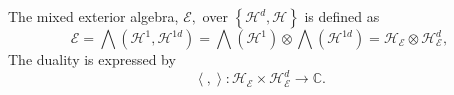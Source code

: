 \documentclass[aps,preprint]{revtex4}%
\begin{document}
The mixed exterior algebra, $\mathcal{E},$ over $\left\{  \mathcal{H}%
^{d},\mathcal{H}\right\}  $ is defined as
\begin{equation}
\mathcal{E}=%
{\textstyle\bigwedge}
\left(  \mathcal{H}^{1},\mathcal{H}^{1d}\right)  =%
{\textstyle\bigwedge}
\left(  \mathcal{H}^{1}\right)  \otimes%
{\textstyle\bigwedge}
\left(  \mathcal{H}^{1d}\right)  =\mathcal{H}_{\mathcal{E}}\otimes
\mathcal{H}_{\mathcal{E}}^{d},
\end{equation}
The duality is expressed by
\begin{equation}
\left\langle ,\right\rangle :\mathcal{H}_{\mathcal{E}}\times\mathcal{H}%
_{\mathcal{E}}^{d}\rightarrow\mathbb{C}.
\end{equation}
\end{document}
